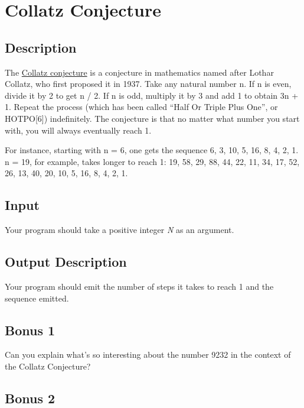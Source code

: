 \section{Collatz Conjecture}

\subsection*{Description}\label{description-19}

The \href{https://en.wikipedia.org/wiki/Collatz_conjecture}{Collatz
conjecture} is a conjecture in mathematics named after Lothar Collatz,
who first proposed it in 1937. Take any natural number n. If n is even,
divide it by 2 to get n / 2. If n is odd, multiply it by 3 and add 1 to
obtain 3n + 1. Repeat the process (which has been called ``Half Or
Triple Plus One'', or HOTPO{[}6{]}) indefinitely. The conjecture is that
no matter what number you start with, you will always eventually reach
1.

For instance, starting with n = 6, one gets the sequence 6, 3, 10, 5,
16, 8, 4, 2, 1. n = 19, for example, takes longer to reach 1: 19, 58,
29, 88, 44, 22, 11, 34, 17, 52, 26, 13, 40, 20, 10, 5, 16, 8, 4, 2, 1.

\subsection*{Input}\label{input-1}

Your program should take a positive integer \emph{N} as an argument.

\subsection*{Output Description}\label{output-description-14}

Your program should emit the number of steps it takes to reach 1 and the
sequence emitted.

\subsection*{Bonus 1}\label{bonus-1}

Can you explain what's so interesting about the number 9232 in the
context of the Collatz Conjecture?

\subsection*{Bonus 2}\label{bonus-2}

